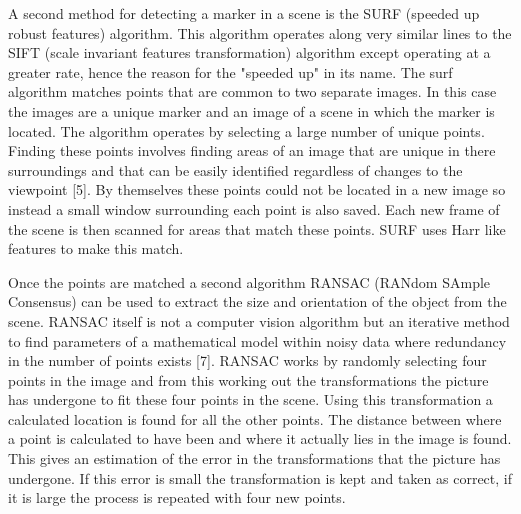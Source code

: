 A second method for detecting a marker in a scene is the SURF (speeded up robust features) algorithm. This algorithm operates along very similar lines to the SIFT (scale invariant features transformation) algorithm except operating at a greater rate, hence the reason for the "speeded up" in its name. The surf algorithm matches points that are common to two separate images. In this case the images are a unique marker and an image of a scene in which the marker is located. The algorithm operates by selecting a large number of unique points. Finding these points involves finding areas of an image that are unique in there surroundings and that can be easily identified regardless of changes to the viewpoint [5]. By themselves these points could not be located in a new image so instead a small window surrounding each point is also saved. Each new frame of the scene is then scanned for areas that match these points. SURF uses Harr like features to make this match.

Once the points are matched a second algorithm RANSAC (RANdom SAmple Consensus) can be used to extract the size and orientation of the object from the scene. RANSAC itself is not a computer vision algorithm but an iterative method to find parameters of a mathematical model within noisy data where redundancy in the number of points exists [7]. RANSAC works by randomly selecting four points in the image and from this working out the transformations the picture has undergone to fit these four points in the scene. Using this transformation a calculated location is found for all the other points. The distance between where a point is calculated to have been and where it actually lies in the image is found. This gives an estimation of the error in the transformations that the picture has undergone. If this error is small the transformation is kept and taken as correct, if it is large the process is repeated with four new points.